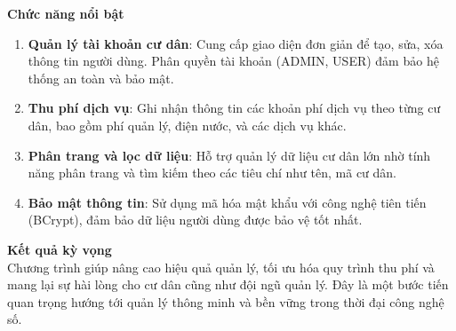 \documentclass{article}
\begin{document}
\textbf{Chức năng nổi bật}
\begin{enumerate}
    \item \textbf{Quản lý tài khoản cư dân}:
        Cung cấp giao diện đơn giản để tạo, sửa, xóa thông tin người dùng.
        Phân quyền tài khoản (ADMIN, USER) đảm bảo hệ thống an toàn và bảo mật.
    \item \textbf{Thu phí dịch vụ}:
        Ghi nhận thông tin các khoản phí dịch vụ theo từng cư dân, bao gồm phí quản lý, điện nước, và các dịch vụ khác.
    \item \textbf{Phân trang và lọc dữ liệu}:
        Hỗ trợ quản lý dữ liệu cư dân lớn nhờ tính năng phân trang và tìm kiếm theo các tiêu chí như tên, mã cư dân.
    \item \textbf{Bảo mật thông tin}:
        Sử dụng mã hóa mật khẩu với công nghệ tiên tiến (BCrypt), đảm bảo dữ liệu người dùng được bảo vệ tốt nhất.
\end{enumerate}

\textbf{Kết quả kỳ vọng}\\
Chương trình giúp nâng cao hiệu quả quản lý, tối ưu hóa quy trình thu phí và mang lại sự hài lòng cho cư dân cũng như đội ngũ quản lý. Đây là một bước tiến quan trọng hướng tới quản lý thông minh và bền vững trong thời đại công nghệ số.
\end{document}
